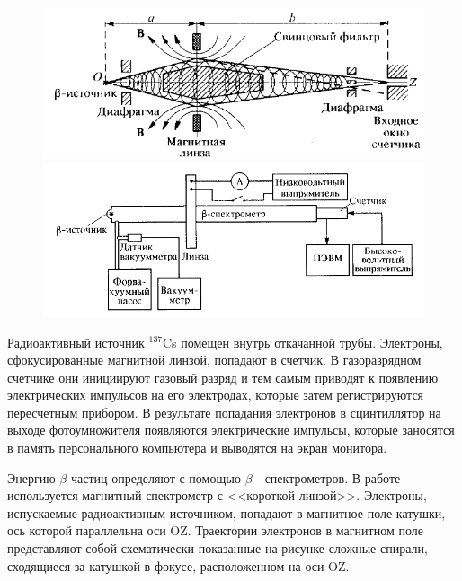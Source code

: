 \documentclass[a4paper, 12pt]{article}%
\begin{document}
\begin{figure}[h]
	\begin{center}
		\begin{minipage}[h]{0.48\linewidth}
			\includegraphics[width=1\linewidth]{Схема.PNG}
		\end{minipage}
	\hfill 
		\begin{minipage}[h]{0.48\linewidth}
			\includegraphics[width=1\linewidth]{Установка.PNG}
		\end{minipage}
	\end{center}
\end{figure}

	Радиоактивный источник $^{137}$Cs помещен внутрь откачанной трубы.  Электроны, сфокусированные магнитной линзой,  попадают в счетчик.  В газоразрядном счетчике они инициируют газовый разряд и тем самым приводят к появлению электрических импульсов на его электродах,  которые затем регистрируются пересчетным прибором.  В результате попадания электронов в сцинтиллятор на выходе фотоумножителя появляются электрические импульсы, которые заносятся в память персонального компьютера и выводятся на экран монитора.

	Энергию $\beta$-частиц определяют с помощью $\beta$ - спектрометров.  В работе используется магнитный спектрометр с <<короткой линзой>>.  Электроны,  испускаемые радиоактивным источником,  попадают в магнитное поле катушки,  ось которой параллельна оси OZ.  Траектории электронов в магнитном поле представляют собой схематически показанные на рисунке сложные спирали,  сходящиеся за катушкой в фокусе,  расположенном на оси OZ.
\end{document}
